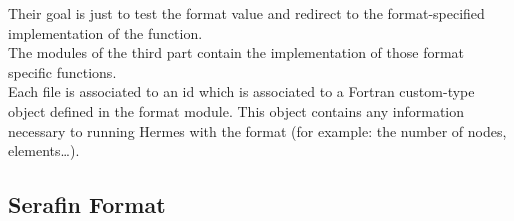 %
Their goal is just to test the format value and redirect to the
format-specified implementation of the function.\\
%
The modules of the third part contain the implementation of those format
specific functions.\\
%
Each file is associated to an id which is associated to a Fortran custom-type
object defined in the format module. This object contains any information
necessary to running Hermes with the format (for example: the number of nodes,
elements\ldots).



%
\subsection{Serafin Format}
%

%
